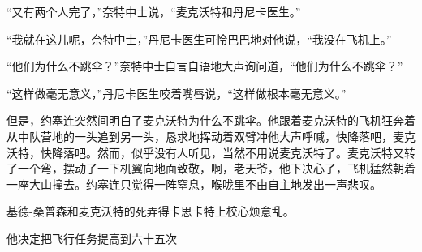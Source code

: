     “又有两个人完了，”奈特中士说，“麦克沃特和丹尼卡医生。”

    “我就在这儿呢，奈特中士，”丹尼卡医生可怜巴巴地对他说，“我没在飞机上。”

    “他们为什么不跳伞？”奈特中士自言自语地大声询问道，“他们为什么不跳伞？”

    “这样做毫无意义，”丹尼卡医生咬着嘴唇说，“这样做根本毫无意义。”

    但是，约塞连突然间明白了麦克沃特为什么不跳伞。他跟着麦克沃特的飞机狂奔着从中队营地的一头追到另一头，恳求地挥动着双臂冲他大声呼喊，快降落吧，麦克沃特，快降落吧。然而，似乎没有人听见，当然不用说麦克沃特了。麦克沃特又转了一个弯，摆动了一下机翼向地面致敬，啊，老天爷，他下决心了，飞机猛然朝着一座大山撞去。约塞连只觉得一阵窒息，喉咙里不由自主地发出一声悲叹。

    基德-桑普森和麦克沃特的死弄得卡思卡特上校心烦意乱。

    他决定把飞行任务提高到六十五次
